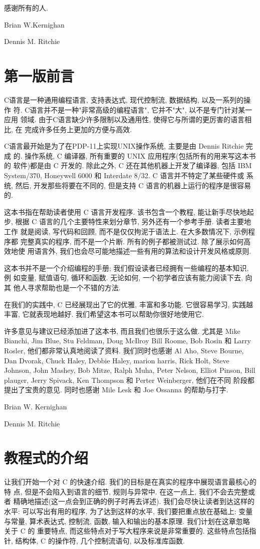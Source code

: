 \documentclass[nofonts, a4paper, oneside, 10pt]{ctexbook}
\numberwithin{exercnt}{chapter}
\begin{document}
感谢所有的人.
 
Brian W.Kernighan

Dennis M. Ritchie

\chapter{第一版前言}
C语言是一种通用编程语言, 支持表达式, 现代控制流, 数据结构, 以及一系列的操作
符. C语言并不是一种"非常高级的编程语言", 它并不"大", 以不是专门针对某一应用
领域. 由于C语言缺少许多限制以及通用性, 使得它与所谓的更厉害的语言相比, 在
完成许多任务上更加的方便与高效.

C语言最开始是为了在PDP-11上实现UNIX操作系统, 主要是由 Dennis Ritchie 完成
的. 操作系统, C 编译器, 所有重要的 UNIX 应用程序(包括所有的用来写这本书的
软件)都是由 C 开发的. 除此之外, C 还在其他机器上开发了编译器, 包括 IBM
System/370, Honeywell 6000 和 Interdate 8/32. C 语言并不特定了某些硬件或
系统, 然后, 开发那些将要在不同的, 但是支持 C 语言的机器上运行的程序是很容易
的.

这本书指在帮助读者使用 C 语言开发程序. 该书包含一个教程, 能让新手尽快地起步,
根据 C 语言的几个主要特性来划分章节, 另外还有一个参考手册. 读者主要地工作
就是阅读, 写代码和回顾, 而不是仅仅拘泥于语法上. 在大多数情况下, 示例程序都
完整真实的程序, 而不是一个片断. 所有的例子都被测试过. 除了展示如何高效地使
用语言外, 我们也会尽可能地描述一些有用的算法和设计开发风格或原则.

这本书并不是一个介绍编程的手册; 我们假设读者已经拥有一些编程的基本知识, 例
如变量, 赋值语句, 循环和函数. 无论如何, 一个初学者应该有能力阅读下去, 向其
他人寻求帮助也是一个不错的方法.

在我们的实践中, C 已经展现出了它的优雅, 丰富和多功能. 它很容易学习, 实践越
丰富, 它就表现地越好. 我们希望这本书可以帮助你很好地使用它.

许多意见与建议已经添加进了这本书, 而且我们也很乐于这么做. 尤其是 Mike 
Bianchi, Jim Blue, Stu Feldman, Doug McIlroy Bill Roome, Bob Rosin 和 Larry
Rosler, 他们都非常认真地阅读了资料. 我们同时也感谢 Al Aho, Steve Bourne, 
Dan Dvorak, Chuck Haley, Debbie Haley, marion harris, Rick Holt, Steve 
Johnson, John Mashey, Bob Mitze, Ralph Muha, Peter Nelson, Elliot Pinson, 
Bill plauger, Jerry Spivack, Ken Thompson 和 Perter Weinberger, 他们在不同
阶段都提出了宝贵的意见. 同时也感谢 Mile Lesk 和 Joe Ossanna 的帮助与打字.

Brian W. Kernighan

Dennis M. Ritchie

\mainmatter
\chapter{教程式的介绍}\label{chap_tuto}
让我们开始一个对 C 的快速介绍. 我们的目标是在真实的程序中展现语言最核心的特
点, 但是不会陷入到语言的细节, 规则与异常中. 在这一点上, 我们不会去完整或者
精确地描述(这一点会到正确的例子时再去详述). 我们会尽快让读者到达这样的水平:
可以写出有用的程序, 为了达到这样的水平, 我们要把重点放在基础上: 变量与常量,
算术表达式, 控制流, 函数, 输入和输出的基本原理. 我们计划在这章忽略关于 C 的
重要特点, 而这些特点对于写大程序来说是非常重要的. 这些特点包括指针, 结构体,
C 的操作符, 几个控制流语句, 以及标准库函数.
\end{document}
